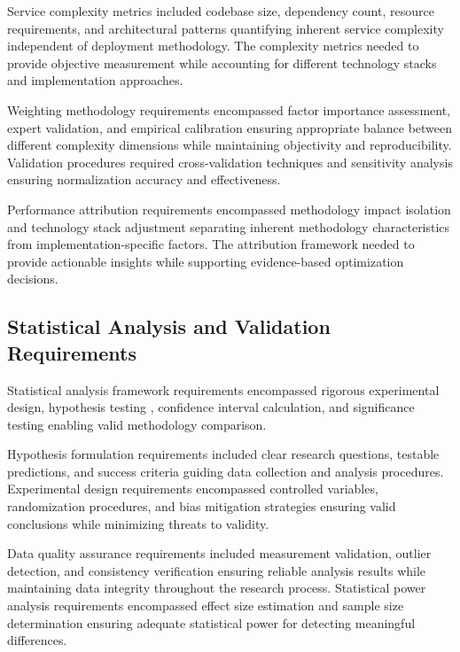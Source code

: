 Service complexity metrics included codebase size, dependency count, resource requirements, and architectural patterns quantifying inherent service complexity independent of deployment methodology. The complexity metrics needed to provide objective measurement while accounting for different technology stacks and implementation approaches.


Weighting methodology requirements encompassed factor importance assessment, expert validation, and empirical calibration ensuring appropriate balance between different complexity dimensions while maintaining objectivity and reproducibility. Validation procedures required cross-validation techniques and sensitivity analysis ensuring normalization accuracy and effectiveness.

Performance attribution requirements encompassed methodology impact isolation and technology stack adjustment separating inherent methodology characteristics from implementation-specific factors. The attribution framework needed to provide actionable insights while supporting evidence-based optimization decisions.

\subsection{Statistical Analysis and Validation Requirements}

Statistical analysis framework requirements encompassed rigorous experimental design, hypothesis testing \cite{cohen_statistical1988}, confidence interval calculation, and significance testing enabling valid methodology comparison.

Hypothesis formulation requirements included clear research questions, testable predictions, and success criteria guiding data collection and analysis procedures. Experimental design requirements encompassed controlled variables, randomization procedures, and bias mitigation strategies ensuring valid conclusions while minimizing threats to validity.


Data quality assurance requirements included measurement validation, outlier detection, and consistency verification ensuring reliable analysis results while maintaining data integrity throughout the research process. Statistical power analysis requirements encompassed effect size estimation and sample size determination ensuring adequate statistical power for detecting meaningful differences.

